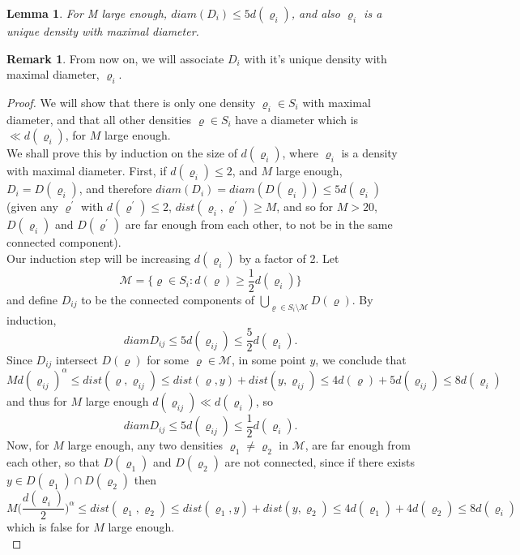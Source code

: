 \documentclass[11pt,reqno]{article}
\newtheorem{lemma}[thm]{Lemma}
\theoremstyle{definition}
\newtheorem*{remark}{Remark}
\numberwithin{equation}{section}
\begin{document}
\begin{lemma} \label{lemma:appendixE1}
For M large enough, $diam(D_i) \leq 5 d(\varrho_i)$, and also $\varrho_i$ is a unique density with maximal diameter.
\end{lemma}

\begin{remark}
From now on, we will associate $D_i$ with it's unique density with maximal diameter, $\varrho_i$.
\end{remark}

\begin{proof}
We will show that there is only one density $\varrho_i \in S_i$ with maximal diameter, and that all other densities $\varrho \in S_i$ have a diameter which is $\ll d(\varrho_i)$, for $M$ large enough.\\
We shall prove this by induction on the size of $d(\varrho_i)$, where $\varrho_i$ is a density with maximal diameter. First, if $d(\varrho_i) \leq 2$, and $M$ large enough, $D_i = D(\varrho_i)$, and therefore $diam(D_i) = diam(D(\varrho_i)) \leq 5d(\varrho_i)$ (given any $\varrho^\prime$ with $d(\varrho^\prime) \leq 2$, $dist(\varrho_i,\varrho^\prime) \geq M$, and so for $M>20$, $D(\varrho_i)$ and $D(\varrho^\prime)$ are far enough from each other, to not be in the same connected component).\\
Our induction step will be increasing $d(\varrho_i)$ by a factor of 2. Let
$$
\mathscr{M} = \{ \varrho \in S_i: d(\varrho) \geq \frac{1}{2}d(\varrho_i) \}
$$
and define $D_{ij}$ to be the connected components of $ \bigcup_{\varrho \in S_i \setminus \mathscr{M}} D(\varrho)$. By induction, 
$$
diamD_{ij} \leq 5d(\varrho_{ij}) \leq \frac{5}{2} d(\varrho_i).
$$
Since $D_{ij}$ intersect $D(\varrho)$ for some $\varrho \in \mathscr{M}$, in some point $y$, we conclude that
$$
Md(\varrho_{ij})^\alpha \leq dist(\varrho, \varrho_{ij}) \leq 
dist(\varrho, y) + dist(y, \varrho_{ij}) \leq 4d(\varrho) + 5d(\varrho_{ij}) \leq 8d(\varrho_i)
$$
and thus for $M$ large enough $d(\varrho_{ij}) \ll d(\varrho_i)$, so
$$
diamD_{ij} \leq 5d(\varrho_{ij}) \leq \frac{1}{2} d(\varrho_i).
$$
Now, for $M$ large enough, any two densities $\varrho_1 \neq \varrho_2$ in $\mathscr{M}$, are far enough from each other, so that $D(\varrho_1)$ and $D(\varrho_2)$ are not connected, since if there exists $y \in D(\varrho_1)\cap D(\varrho_2)$ then
$$
M\Big( \frac{d(\varrho_i)}{2} \Big)^\alpha \leq dist(\varrho_1, \varrho_2) \leq dist(\varrho_1, y) + dist(y, \varrho_2) \leq 4d(\varrho_1) + 4d(\varrho_2) \leq 8d(\varrho_i)
$$
which is false for $M$ large enough.\\

\end{proof}
\end{document}
